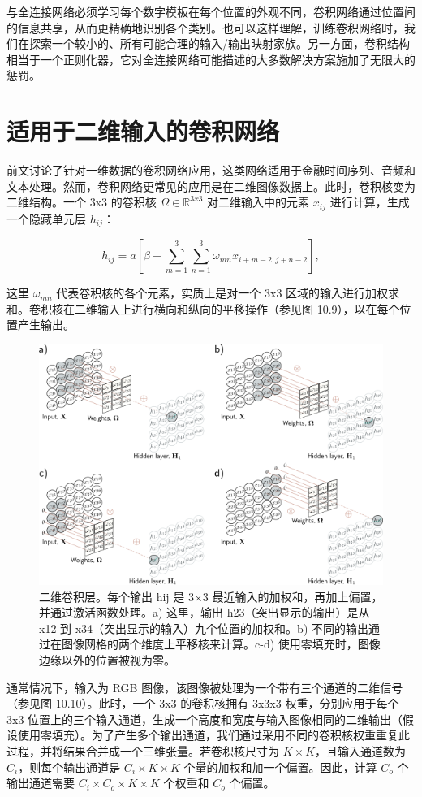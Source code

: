 与全连接网络必须学习每个数字模板在每个位置的外观不同，卷积网络通过位置间的信息共享，从而更精确地识别各个类别。也可以这样理解，训练卷积网络时，我们在探索一个较小的、所有可能合理的输入/输出映射家族。另一方面，卷积结构相当于一个正则化器，它对全连接网络可能描述的大多数解决方案施加了无限大的惩罚。

\section{适用于二维输入的卷积网络}
前文讨论了针对一维数据的卷积网络应用，这类网络适用于金融时间序列、音频和文本处理。然而，卷积网络更常见的应用是在二维图像数据上。此时，卷积核变为二维结构。一个 3x3 的卷积核 \(\Omega \in \mathbb{R}^{3x3}\) 对二维输入中的元素 \(x_{ij}\) 进行计算，生成一个隐藏单元层 \(h_{ij}\)：

\begin{equation}
h_{ij} = a \left[ \beta + \sum_{m=1}^{3} \sum_{n=1}^{3} \omega_{mn} x_{i+m-2,j+n-2} \right], 
\end{equation}

这里 \(\omega_{mn}\) 代表卷积核的各个元素，实质上是对一个 3x3 区域的输入进行加权求和。卷积核在二维输入上进行横向和纵向的平移操作（参见图 10.9），以在每个位置产生输出。

\begin{figure}[ht!]
	\centering
	\includegraphics[width=0.7\linewidth]{png/chapter10/Conv2D.png}
	\caption{二维卷积层。每个输出 hij 是 3×3 最近输入的加权和，再加上偏置，并通过激活函数处理。a) 这里，输出 h23（突出显示的输出）是从 x12 到 x34（突出显示的输入）九个位置的加权和。b) 不同的输出通过在图像网格的两个维度上平移核来计算。c-d) 使用零填充时，图像边缘以外的位置被视为零。}
\end{figure}


通常情况下，输入为 RGB 图像，该图像被处理为一个带有三个通道的二维信号（参见图 10.10）。此时，一个 3x3 的卷积核拥有 3x3x3 权重，分别应用于每个 3x3 位置上的三个输入通道，生成一个高度和宽度与输入图像相同的二维输出（假设使用零填充）。为了产生多个输出通道，我们通过采用不同的卷积核权重重复此过程，并将结果合并成一个三维张量。若卷积核尺寸为 \(K \times K\)，且输入通道数为 \(C_i\)，则每个输出通道是 \(C_i \times K \times K\) 个量的加权和加一个偏置。因此，计算 \(C_o\) 个输出通道需要 \(C_i \times C_o \times K \times K\) 个权重和 \(C_o\) 个偏置。


